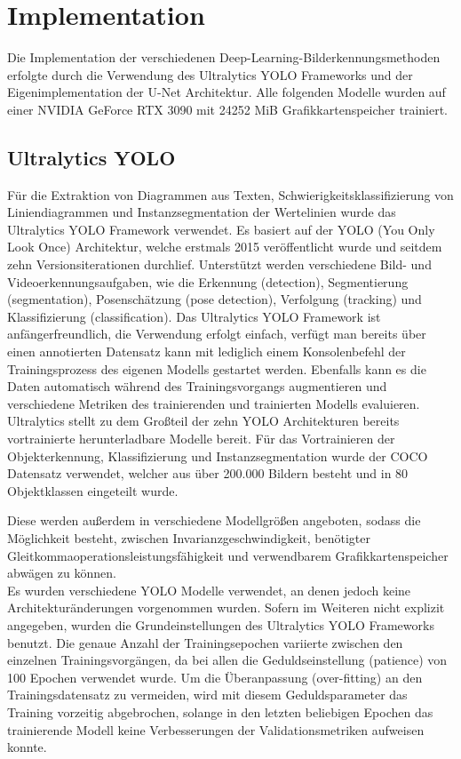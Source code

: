 \chapter{Implementation}
\label{ch:implementation}

Die Implementation der verschiedenen Deep-Learning-Bilderkennungsmethoden erfolgte durch die Verwendung des Ultralytics YOLO \cite{Jocher_Ultralytics_YOLO_2023} Frameworks und der Eigenimplementation der U-Net \cite{ronneberger2015unetconvolutionalnetworksbiomedical} Architektur. Alle folgenden Modelle wurden auf einer NVIDIA GeForce RTX 3090 mit 24252 MiB Grafikkartenspeicher trainiert.

\section{Ultralytics YOLO}
Für die Extraktion von Diagrammen aus Texten, Schwierigkeitsklassifizierung von Liniendiagrammen und Instanzsegmentation der Wertelinien wurde das Ultralytics YOLO Framework verwendet. Es basiert auf der YOLO (You Only Look Once) Architektur, welche erstmals 2015 \cite{redmon2016lookonceunifiedrealtime} veröffentlicht wurde und seitdem zehn Versionsiterationen durchlief. Unterstützt werden verschiedene Bild- und Videoerkennungsaufgaben, wie die Erkennung (detection), Segmentierung (segmentation), Posenschätzung (pose detection), Verfolgung (tracking) und Klassifizierung (classification). Das Ultralytics YOLO Framework ist anfängerfreundlich, die Verwendung erfolgt einfach, verfügt man bereits über einen annotierten Datensatz kann mit lediglich einem Konsolenbefehl der Trainingsprozess des eigenen Modells gestartet werden. Ebenfalls kann es die Daten automatisch während des Trainingsvorgangs augmentieren und verschiedene Metriken des trainierenden und trainierten Modells evaluieren.
\\
Ultralytics stellt zu dem Großteil der zehn YOLO Architekturen bereits vortrainierte herunterladbare Modelle bereit. Für das Vortrainieren der Objekterkennung, Klassifizierung und Instanzsegmentation wurde der COCO \cite{lin2015microsoftcococommonobjects} Datensatz verwendet, welcher aus über 200.000 Bildern besteht und in 80 Objektklassen eingeteilt wurde.

Diese werden außerdem in verschiedene Modellgrößen angeboten, sodass die Möglichkeit besteht, zwischen Invarianzgeschwindigkeit, benötigter Gleitkommaoperationsleistungsfähigkeit und verwendbarem Grafikkartenspeicher abwägen zu können.
\\
Es wurden verschiedene YOLO Modelle verwendet, an denen jedoch keine Architekturänderungen vorgenommen wurden.
Sofern im Weiteren nicht explizit angegeben, wurden die Grundeinstellungen des Ultralytics YOLO Frameworks benutzt. Die genaue Anzahl der Trainingsepochen variierte zwischen den einzelnen Trainingsvorgängen, da bei allen die Geduldseinstellung (patience) von 100 Epochen verwendet wurde. Um die Überanpassung (over-fitting) an den Trainingsdatensatz zu vermeiden, wird mit diesem Geduldsparameter das Training vorzeitig abgebrochen, solange in den letzten beliebigen Epochen das trainierende Modell keine Verbesserungen der Validationsmetriken aufweisen konnte.

